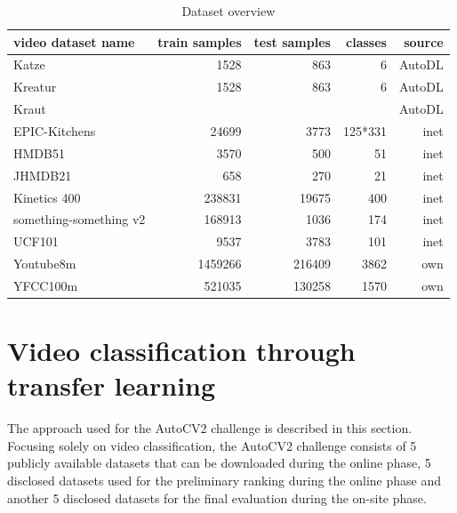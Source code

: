 \documentclass{article}
\begin{document}
\begin{table}
\begin{tabular}{|l|r|r|r|r|}
\hline
\hline
video dataset name & train samples & test samples & classes & source \\
\hline
Katze & 1528 & 863 & 6 & AutoDL \\
Kreatur & 1528 & 863 & 6 & AutoDL \\ 
Kraut & & & & AutoDL \\
EPIC-Kitchens & 24699 & 3773 & 125*331 & inet \\
HMDB51 & 3570 & 500 & 51 & inet \\ 
JHMDB21 & 658 & 270 & 21 & inet \\
Kinetics 400 & 238831 & 19675 & 400 & inet \\
something-something v2 & 168913 & 1036 & 174 & inet \\
UCF101 & 9537 & 3783 & 101 & inet \\
Youtube8m  & 1459266 & 216409 & 3862 & own \\
YFCC100m & 521035 & 130258 & 1570 & own \\
\hline
\end{tabular}
\normalsize
\caption{Dataset overview}
\label{table:datasets}
\end{table}

\section{Video classification through transfer learning}
\label{sec:tl}

The approach used for the AutoCV2 challenge is described in this section. Focusing solely on video classification, the AutoCV2 challenge consists of 5 publicly available datasets that can be downloaded during the online phase, 5 disclosed datasets used for the preliminary ranking during the online phase and another 5 disclosed datasets for the final evaluation during the on-site phase. 
\end{document}
